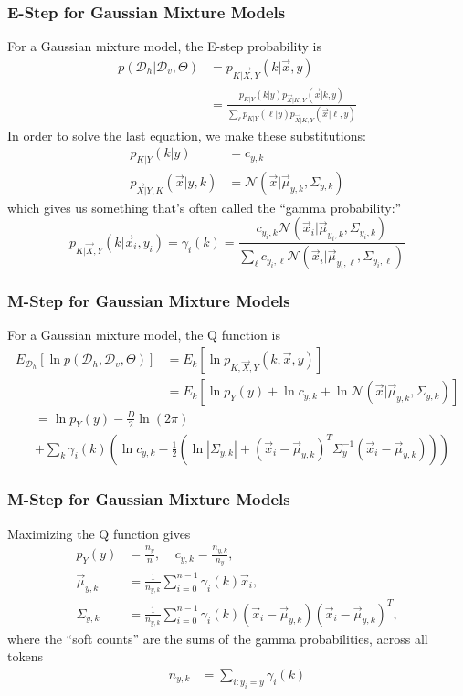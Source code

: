 \documentclass{beamer}
\begin{document}
\begin{frame}
  \frametitle{E-Step for Gaussian Mixture Models}

  For a Gaussian mixture model, the E-step probability is
  \begin{align*}
    p({\mathcal D}_h|{\mathcal D}_v,\Theta)
    &= p_{K|\vec{X},Y}(k|\vec{x},y)\\
    &= \frac{p_{K|Y}(k|y)p_{\vec{X}|K,Y}(\vec{x}|k,y)}{\sum_\ell p_{K|Y}(\ell|y)p_{\vec{X}|K,Y}(\vec{x}|\ell,y)}
  \end{align*}
  In order to solve the last equation, we make these substitutions:
  \begin{align*}
    p_{K|Y}(k|y) &= c_{y,k}\\
    p_{\vec{X}|Y,K}(\vec{x}|y,k) &= {\mathcal N}(\vec{x}|\vec\mu_{y,k},\Sigma_{y,k})
  \end{align*}
  which gives us something that's often called the ``gamma probability:''
  \begin{displaymath}
  p_{K|\vec{X},Y}(k|\vec{x}_i,y_i) = \gamma_i(k) = 
  \frac{c_{y_i,k}{\mathcal N}(\vec{x}_i|\vec\mu_{y_i,k},\Sigma_{y_i,k})}{\sum_\ell c_{y_i,\ell}{\mathcal N}(\vec{x}_i|\vec\mu_{y_i,\ell},\Sigma_{y_i,\ell})}
  \end{displaymath}
\end{frame}

\begin{frame}
  \frametitle{M-Step for Gaussian Mixture Models}

  For a Gaussian mixture model, the Q function is
  \begin{align*}
    E_{\mathcal D_h}\left[\ln p({\mathcal D}_h,{\mathcal D}_v,\Theta)\right]
    &= E_k\left[ \ln p_{K,\vec{X},Y}(k,\vec{x},y)\right]\\
    &= E_k\left[\ln p_Y(y)+ \ln c_{y,k} + \ln{\mathcal N}(\vec{x}|\vec\mu_{y,k},\Sigma_{y,k})\right]
  \end{align*}
  \begin{align*}
    &= \ln p_Y(y)-\frac{D}{2}\ln(2\pi)\\
    &+ \sum_k \gamma_i(k)\left(\ln c_{y,k} -\frac{1}{2}
    \left(\ln|\Sigma_{y,k}|+(\vec{x}_i-\vec\mu_{y,k})^T\Sigma_y^{-1}(\vec{x}_i-\vec\mu_{y,k})\right)\right)
  \end{align*}
\end{frame}

\begin{frame}
  \frametitle{M-Step for Gaussian Mixture Models}

  Maximizing the Q function gives
  \begin{align*}
    p_Y(y) &= \frac{n_y}{n},~~~~~    c_{y,k} = \frac{n_{y,k}}{n_y},\\
    \vec\mu_{y,k} &=\frac{1}{n_{y,k}}\sum_{i=0}^{n-1}\gamma_i(k)\vec{x}_i,\\
    \Sigma_{y,k} &=
    \frac{1}{n_{y,k}}\sum_{i=0}^{n-1}\gamma_i(k)(\vec{x}_i-\vec\mu_{y,k})(\vec{x}_i-\vec\mu_{y,k})^T,
  \end{align*}
  where the ``soft counts'' are the sums of the gamma probabilities, across all tokens
  \begin{align*}
    n_{y,k} &= \sum_{i:y_i=y}\gamma_{i}(k)
  \end{align*}
\end{frame}
\end{document}
